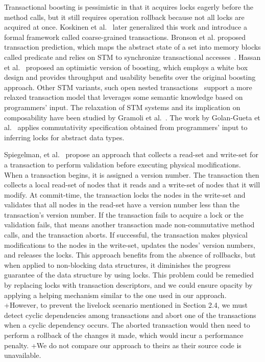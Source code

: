 \documentclass{sig-alternate-05-2015}
\begin{document}
Transactional boosting is pessimistic in that it acquires locks eagerly before the method calls, but it still requires operation rollback because not all locks are acquired at once.
Koskinen et al.~\cite{koskinen2010coarse} later generalized this work and introduce a formal framework called coarse-grained transactions.
Bronson et al. proposed transaction prediction, which maps the abstract state of a set into memory blocks called predicate and relies on STM to synchronize transactional accesses~\cite{bronson2010transactional}.
Hassan et al.~\cite{hassan2014developing} proposed an optimistic version of boosting, which employs a white box design and provides throughput and usability benefits over the original boosting approach.
Other STM variants, such open nested transactions~\cite{ni2007open} support a more relaxed transaction model that leverages some semantic knowledge based on programmers' input.
The relaxation of STM systems and its implication on composability have been studied by Gramoli et al.~\cite{gramoli2013composing}.
The work by Golan-Gueta et al.~\cite{golan2015automatic} applies commutativity specification obtained from programmers' input to inferring locks for abstract data types.

Spiegelman, et al.~\cite{spiegelman2016transactional} propose an approach that collects a read-set and write-set for a transaction to perform validation before executing physical modifications.
When a transaction begins, it is assigned a version number.
The transaction then collects a local read-set of nodes that it reads and a write-set of nodes that it will modify.
At commit-time, the transaction locks the nodes in the write-set and validates that all nodes in the read-set have a version number less than the transaction's version number.
If the transaction fails to acquire a lock or the validation fails, that means another transaction made non-commutative method calls, and the transaction aborts.
If successful, the transaction makes physical modifications to the nodes in the write-set, updates the nodes' version numbers, and releases the locks.
This approach benefits from the absence of rollbacks, but when applied to non-blocking data structures, it diminishes the progress guarantee of the data structure by using locks.
This problem could be remedied by replacing locks with transaction descriptors, and we could ensure opacity by applying a helping mechanism similar to the one used in our approach.
+However, to prevent the livelock scenario mentioned in Section 2.4, we must detect cyclic dependencies among transactions and abort one of the transactions when a cyclic dependency occurs.
The aborted transaction would then need to perform a rollback of the changes it made, which would incur a performance penalty.
+We do not compare our approach to theirs as their source code is unavailable.
\end{document}
